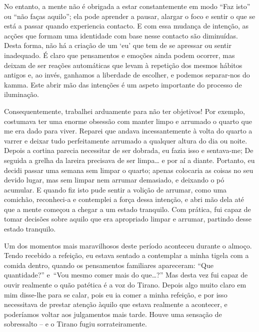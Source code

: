 No entanto, a mente não é obrigada a estar constantemente em modo “Faz
isto” ou “não faças aquilo”; ela pode aprender a pausar, alargar o foco
e sentir o que se está a passar quando experiencia contacto. E com essa
mudança de intenção, as acções que formam uma identidade com base nesse
contacto são diminuídas. Desta forma, não há a criação de um `eu' que
tem de se apressar ou sentir inadequado. É claro que pensamentos e
emoções ainda podem ocorrer, mas deixam de ser reações automáticas que
levam à repetição dos mesmos hábitos antigos e, ao invés, ganhamos a
liberdade de escolher, e podemos separar-nos do kamma. Este abrir mão
das intenções é um aspeto importante do processo de iluminação.

\sectionBreak

Consequentemente, trabalhei arduamente para não ter objetivos! Por
exemplo, costumava ter uma enorme obsessão com manter limpo e arrumado o
quarto que me era dado para viver. Reparei que andava incessantemente à
volta do quarto a varrer e deixar tudo perfeitamente arrumado a qualquer
altura do dia ou noite. Depois a cortina parecia necessitar de ser
dobrada, eu fazia isso e sentava-me; De seguida a grelha da lareira
precisava de ser limpa\ldots{} e por aí a diante. Portanto, eu decidi passar
uma semana sem limpar o quarto; apenas colocaria as coisas no seu devido
lugar, mas sem limpar nem arrumar demasiado, e deixando o pó acumular. E
quando fiz isto pude sentir a volição de arrumar, como uma comichão,
reconheci-a e contemplei a força dessa intenção, e abri mão dela até que
a mente começou a chegar a um estado tranquilo. Com prática, fui capaz
de tomar decisões sobre aquilo que era apropriado limpar e arrumar,
partindo desse estado tranquilo.

\enlargethispage*{\baselineskip}

Um dos momentos mais maravilhosos deste período aconteceu durante o
almoço. Tendo recebido a refeição, eu estava sentado a contemplar a
minha tigela com a comida dentro, quando os pensamentos familiares
apareceram: “Que quantidade?” e~“Vou mesmo comer mais do que\ldots{}?” Mas
desta vez fui capaz de ouvir realmente o quão patética é a voz do
Tirano. Depois algo muito claro em mim disse-lhe para se calar, pois eu
ia comer a minha refeição, e por isso necessitava de prestar atenção
àquilo que estava realmente a acontecer, e poderíamos voltar aos
julgamentos mais tarde. Houve uma sensação de sobressalto -- e o Tirano
fugiu sorrateiramente.

\enlargethispage*{\baselineskip}

